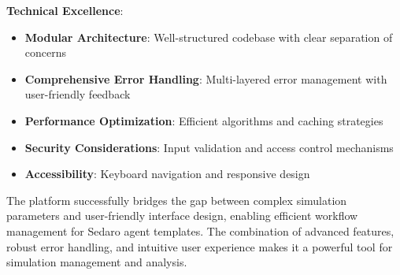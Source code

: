 \documentclass[12pt,a4paper]{article}
\begin{document}
\textbf{Technical Excellence}:
\begin{itemize}
    \item \textbf{Modular Architecture}: Well-structured codebase with clear separation of concerns
    \item \textbf{Comprehensive Error Handling}: Multi-layered error management with user-friendly feedback
    \item \textbf{Performance Optimization}: Efficient algorithms and caching strategies
    \item \textbf{Security Considerations}: Input validation and access control mechanisms
    \item \textbf{Accessibility}: Keyboard navigation and responsive design
\end{itemize}

The platform successfully bridges the gap between complex simulation parameters and user-friendly interface design, enabling efficient workflow management for Sedaro agent templates. The combination of advanced features, robust error handling, and intuitive user experience makes it a powerful tool for simulation management and analysis.
\end{document}
